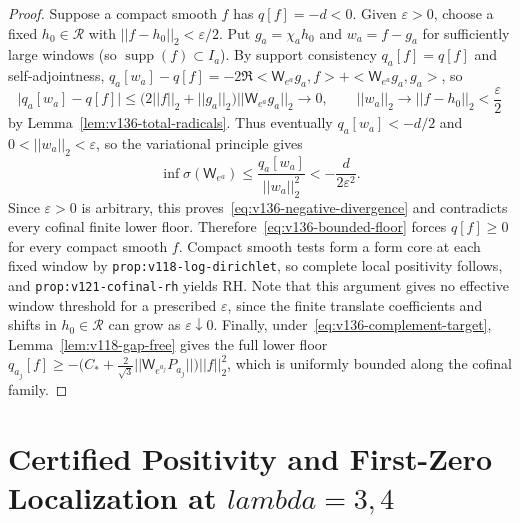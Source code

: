 \documentclass[11pt]{article}
\def\lambda{lambda}%
\def\norm#1{||#1||}%
\def\ip#1#2{<#1,#2>}%
\theoremstyle{remark}
\newcommand{\norm}[1]{\left\lVert #1\right\rVert}
\newcommand{\ip}[2]{\left\langle #1,#2\right\rangle}
\begin{document}
\begin{proof}
Suppose a compact smooth $f$ has $q[f] = -d < 0$. Given $\varepsilon > 0$, choose a fixed $h_0 \in \mathcal{R}$ with $\norm{f - h_0}_2 < \varepsilon/2$. Put $g_a = \chi_a h_0$ and $w_a = f - g_a$ for sufficiently large windows (so $\operatorname{supp}(f) \subset I_a$). By support consistency $q_a[f] = q[f]$ and self-adjointness, $q_a[w_a] - q[f] = -2\Re\ip{\mathsf{W}_{e^a}g_a}{f} + \ip{\mathsf{W}_{e^a}g_a}{g_a}$, so
\[
  \bigl|q_a[w_a] - q[f]\bigr| \le \bigl(2\norm{f}_2 + \norm{g_a}_2\bigr)\norm{\mathsf{W}_{e^a} g_a}_2 \longrightarrow 0, \qquad \norm{w_a}_2 \longrightarrow \norm{f - h_0}_2 < \frac{\varepsilon}{2}
\]
by Lemma~\ref{lem:v136-total-radicals}. Thus eventually $q_a[w_a] < -d/2$ and $0 < \norm{w_a}_2 < \varepsilon$, so the variational principle gives
\begin{equation}\label{eq:v136-negative-amplification}
  \inf\sigma(\mathsf{W}_{e^a}) \le \frac{q_a[w_a]}{\norm{w_a}_2^2} < -\frac{d}{2\varepsilon^2}.
\end{equation}
Since $\varepsilon > 0$ is arbitrary, this proves~\eqref{eq:v136-negative-divergence} and contradicts every cofinal finite lower floor. Therefore~\eqref{eq:v136-bounded-floor} forces $q[f] \ge 0$ for every compact smooth $f$. Compact smooth tests form a form core at each fixed window by \texttt{prop:v118-log-dirichlet}, so complete local positivity follows, and \texttt{prop:v121-cofinal-rh} yields RH. Note that this argument gives no effective window threshold for a prescribed $\varepsilon$, since the finite translate coefficients and shifts in $h_0 \in \mathcal{R}$ can grow as $\varepsilon \downarrow 0$. Finally, under~\eqref{eq:v136-complement-target}, Lemma~\ref{lem:v118-gap-free} gives the full lower floor $q_{a_j}[f] \ge -\bigl(C_* + \frac{2}{\sqrt{3}}\norm{\mathsf{W}_{e^{a_j}}P_{a_j}}\bigr)\norm{f}_2^2$, which is uniformly bounded along the cofinal family.
\end{proof}

\section{Certified Positivity and First-Zero Localization at \texorpdfstring{$\lambda = 3, 4$}{lambda = 3, 4}}
\label{sec:lambda4}
\end{document}
